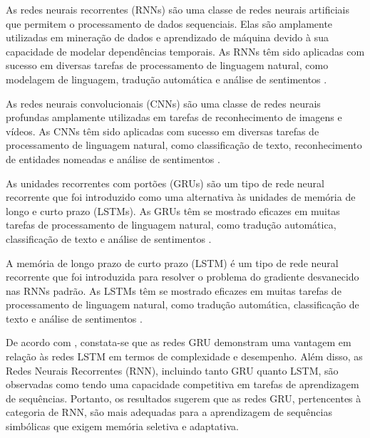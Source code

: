 \begin{quoting}[rightmargin=0cm,leftmargin=4cm]
	\begin{singlespace}
		{\footnotesize \noindent As redes neurais recorrentes (RNNs) são uma classe de redes neurais artificiais que permitem o processamento de dados sequenciais. Elas são amplamente utilizadas em mineração de dados e aprendizado de máquina devido à sua capacidade de modelar dependências temporais. As RNNs têm sido aplicadas com sucesso em diversas tarefas de processamento de linguagem natural, como modelagem de linguagem, tradução automática e análise de sentimentos .}
		
		{\footnotesize \noindent As redes neurais convolucionais (CNNs) são uma classe de redes neurais profundas amplamente utilizadas em tarefas de reconhecimento de imagens e vídeos. As CNNs têm sido aplicadas com sucesso em diversas tarefas de processamento de linguagem natural, como classificação de texto, reconhecimento de entidades nomeadas e análise de sentimentos .}
		
		{\footnotesize \noindent As unidades recorrentes com portões (GRUs) são um tipo de rede neural recorrente que foi introduzido como uma alternativa às unidades de memória de longo e curto prazo (LSTMs). As GRUs têm se mostrado eficazes em muitas tarefas de processamento de linguagem natural, como tradução automática, classificação de texto e análise de sentimentos .}
		
		{\footnotesize \noindent A memória de longo prazo de curto prazo (LSTM) é um tipo de rede neural recorrente que foi introduzida para resolver o problema do gradiente desvanecido nas RNNs padrão. As LSTMs têm se mostrado eficazes em muitas tarefas de processamento de linguagem natural, como tradução automática, classificação de texto e análise de sentimentos .}
	\end{singlespace}
\end{quoting}


De acordo com , constata-se que as redes GRU demonstram uma vantagem em relação às redes LSTM em termos de complexidade e desempenho. Além disso, as Redes Neurais Recorrentes (RNN), incluindo tanto GRU quanto LSTM, são observadas como tendo uma capacidade competitiva em tarefas de aprendizagem de sequências. Portanto, os resultados sugerem que as redes GRU, pertencentes à categoria de RNN, são mais adequadas para a aprendizagem de sequências simbólicas que exigem memória seletiva e adaptativa.


